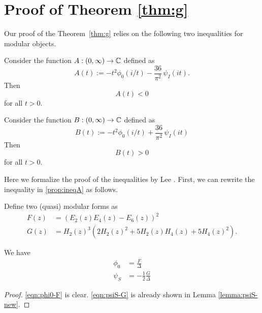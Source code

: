 \section{Proof of Theorem \ref{thm:g}}\label{sec: g}
Our proof of the Theorem~\ref{thm:g} relies on the following two inequalities for modular objects.
\begin{proposition}\label{prop:ineqA}
Consider the function $A:(0,\infty)\to\mathbb{C}$ defined as
\begin{equation}\label{eqn:defA}
A(t):=-t^2\phi_0(i/t)-\frac{36}{\pi^2}\,\psi_I(it).
\end{equation}
Then
\begin{equation}\label{eqn:ineqA}
  A(t) < 0
\end{equation}
for all $t > 0$.
\end{proposition}

\begin{proposition}\label{prop:ineqB}
Consider the function $B:(0,\infty)\to\mathbb{C}$ defined as
\begin{equation}\label{eqn:defB}
  B(t) := -t^2\phi_0(i/t)+\frac{36}{\pi^2}\,\psi_I(it)
\end{equation}
Then
\begin{equation}\label{eqn:ineqB}
  B(t) > 0
\end{equation}
for all $t > 0$.
\end{proposition}

Here we formalize the proof of the inequalities by Lee \cite{Lee}.
First, we can rewrite the inequality in \ref{prop:ineqA} as follows.

\begin{definition}\label{def:FG-definition}
Define two (quasi) modular forms as
\begin{align}
  F(z) &= (E_2(z) E_4(z) - E_6(z))^2 \label{eqn:defF} \\
  G(z) &= H_2(z)^{3} (2 H_{2}(z)^{2} + 5 H_{2}(z) H_{4}(z) + 5 H_{4}(z)^{2}). \label{eqn:defG}
\end{align}
\end{definition}

\begin{lemma}\label{lemma:F-G-phi-psi-identities}
We have
\begin{align}
  \phi_0 &= \frac{F}{\Delta} \label{eqn:phi0-F} \\
  \psi_S &= -\frac{1}{2} \frac{G}{\Delta}\label{eqn:psiS-G}
\end{align}
\end{lemma}
\begin{proof}
\eqref{eqn:phi0-F} is clear.
\eqref{eqn:psiS-G} is already shown in Lemma \ref{lemma:psiS-new}.
\end{proof}


